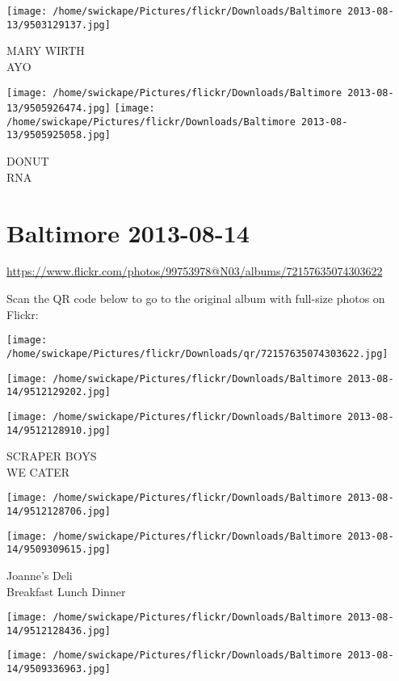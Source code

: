 \documentclass[10pt,letterpaper]{article}
\begin{document}
\vspace{0.25in}
\texttt{[image: /home/swickape/Pictures/flickr/Downloads/Baltimore 2013-08-13/9503129137.jpg]}

MARY WIRTH\\
AYO
\pagebreak

\texttt{[image: /home/swickape/Pictures/flickr/Downloads/Baltimore 2013-08-13/9505926474.jpg]}
\texttt{[image: /home/swickape/Pictures/flickr/Downloads/Baltimore 2013-08-13/9505925058.jpg]}

DONUT\\
RNA
\pagebreak

\section*{Baltimore 2013-08-14}

\url{https://www.flickr.com/photos/99753978@N03/albums/72157635074303622}

Scan the QR code below to go to the original album with full-size photos on Flickr:

\texttt{[image: /home/swickape/Pictures/flickr/Downloads/qr/72157635074303622.jpg]}
\pagebreak

\texttt{[image: /home/swickape/Pictures/flickr/Downloads/Baltimore 2013-08-14/9512129202.jpg]}

\vspace{0.25in}
\texttt{[image: /home/swickape/Pictures/flickr/Downloads/Baltimore 2013-08-14/9512128910.jpg]}

SCRAPER BOYS\\
WE CATER
\pagebreak

\texttt{[image: /home/swickape/Pictures/flickr/Downloads/Baltimore 2013-08-14/9512128706.jpg]}

\vspace{0.25in}
\texttt{[image: /home/swickape/Pictures/flickr/Downloads/Baltimore 2013-08-14/9509309615.jpg]}

Joanne's Deli\\
Breakfast Lunch Dinner
\pagebreak

\texttt{[image: /home/swickape/Pictures/flickr/Downloads/Baltimore 2013-08-14/9512128436.jpg]}

\vspace{0.25in}
\texttt{[image: /home/swickape/Pictures/flickr/Downloads/Baltimore 2013-08-14/9509336963.jpg]}
\end{document}

